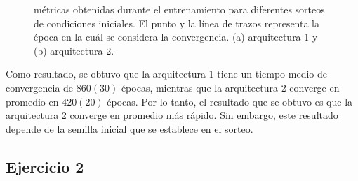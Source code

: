 \documentclass[11pt, twocolumn]{article}
\begin{document}
\begin{figure}[htbp]
  \centering
  \hfill
  \hfill
  \caption{métricas obtenidas durante el entrenamiento para diferentes sorteos de condiciones iniciales. El punto y la línea de trazos representa la época en la cuál se considera la convergencia. (a) arquitectura 1 y (b) arquitectura 2.}
  \label{fig:metrics_e1}
\end{figure}


Como resultado, se obtuvo que la arquitectura 1 tiene un tiempo medio de convergencia de \(860(30)\) épocas, mientras que la arquitectura 2 converge en promedio en \(420(20)\) épocas. Por lo tanto, el resultado que se obtuvo es que la arquitectura 2 converge en promedio más rápido. Sin embargo, este resultado depende de la semilla inicial que se establece en el sorteo.

\subsection*{Ejercicio 2}
\end{document}
